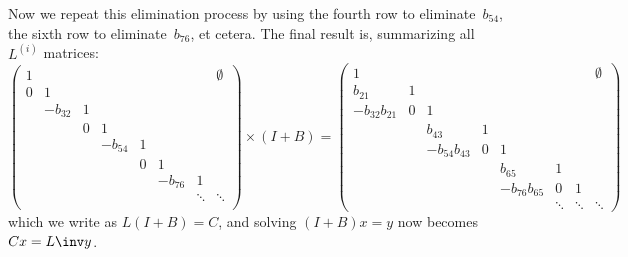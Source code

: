 Now we repeat this elimination process by using the fourth row to
eliminate~$b_{54}$, the sixth row to eliminate~$b_{76}$, et
cetera. The final result is, summarizing all~$L^{(i)}$ matrices:
{\small
\[
  \begin{pmatrix}
    1&&&&&&&\emptyset\\ 0&1\\ &-b_{32}&1\\ &&0&1\\
    &&&-b_{54}&1\\ &&&&0&1\\ &&&&&-b_{76}&1\\ &&&&&&\ddots&\ddots\\
  \end{pmatrix}\times (I+B) =
  \begin{pmatrix}
    1&&&&&&&\emptyset\\ b_{21}&1\\ -b_{32}b_{21}&0&1\\ 
    &&b_{43}&1\\ &&-b_{54}b_{43}&0&1\\
    &&&&b_{65}&1\\ &&&&-b_{76}b_{65}&0&1\\ &&&&&\ddots&\ddots&\ddots
  \end{pmatrix}
\]
}
which we write as $L(I+B)=C$, and solving $(I+B)x=y$ now becomes
$Cx=L\inv y$.

